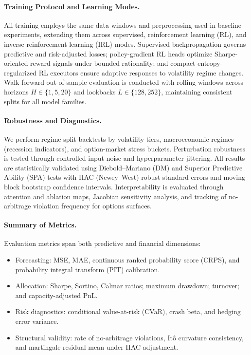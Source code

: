 \documentclass[10pt,twocolumn]{article}
\begin{document}
\paragraph{Training Protocol and Learning Modes.}
All training employs the same data windows and preprocessing used in baseline experiments, extending them across supervised, reinforcement learning (RL), and inverse reinforcement learning (IRL) modes.
Supervised backpropagation governs predictive and risk-adjusted losses; policy-gradient RL heads optimize Sharpe-oriented reward signals under bounded rationality; and compact entropy-regularized RL executors ensure adaptive responses to volatility regime changes.  
Walk-forward out-of-sample evaluation is conducted with rolling windows across horizons $H \in \{1, 5, 20\}$ and lookbacks $L \in \{128, 252\}$, maintaining consistent splits for all model families.

\paragraph{Robustness and Diagnostics.}
We perform regime-split backtests by volatility tiers, macroeconomic regimes (recession indicators), and option-market stress buckets.
Perturbation robustness is tested through controlled input noise and hyperparameter jittering.
All results are statistically validated using Diebold–Mariano (DM) and Superior Predictive Ability (SPA) tests with HAC (Newey–West) robust standard errors and moving-block bootstrap confidence intervals.
Interpretability is evaluated through attention and ablation maps, Jacobian sensitivity analysis, and tracking of no-arbitrage violation frequency for options surfaces.

\paragraph{Summary of Metrics.}
Evaluation metrics span both predictive and financial dimensions:
\begin{itemize}
  \item Forecasting: MSE, MAE, continuous ranked probability score (CRPS), and probability integral transform (PIT) calibration.
  \item Allocation: Sharpe, Sortino, Calmar ratios; maximum drawdown; turnover; and capacity-adjusted PnL.
  \item Risk diagnostics: conditional value-at-risk (CVaR), crash beta, and hedging error variance.
  \item Structural validity: rate of no-arbitrage violations, It\^o curvature consistency, and martingale residual mean under HAC adjustment.
\end{itemize}
\end{document}
